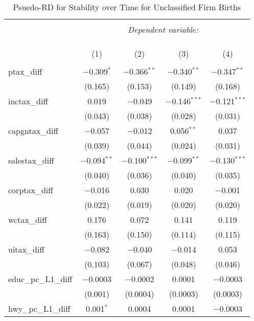 
\begin{table}[!htbp] \centering 
  \caption{Psuedo-RD for Stability over Time for  Unclassified Firm Births} 
  \label{} 
\begin{tabular}{@{\extracolsep{5pt}}lcccc} 
\\[-1.8ex]\hline 
\hline \\[-1.8ex] 
 & \multicolumn{4}{c}{\textit{Dependent variable:}} \\ 
\cline{2-5} 
\\[-1.8ex] & \multicolumn{4}{c}{ } \\ 
\\[-1.8ex] & (1) & (2) & (3) & (4)\\ 
\hline \\[-1.8ex] 
 ptax\_diff & $-$0.309$^{*}$ & $-$0.366$^{**}$ & $-$0.340$^{**}$ & $-$0.347$^{**}$ \\ 
  & (0.165) & (0.153) & (0.149) & (0.168) \\ 
  inctax\_diff & 0.019 & $-$0.049 & $-$0.146$^{***}$ & $-$0.121$^{***}$ \\ 
  & (0.043) & (0.038) & (0.028) & (0.031) \\ 
  capgntax\_diff & $-$0.057 & $-$0.012 & 0.056$^{**}$ & 0.037 \\ 
  & (0.039) & (0.044) & (0.024) & (0.031) \\ 
  salestax\_diff & $-$0.094$^{**}$ & $-$0.100$^{***}$ & $-$0.099$^{**}$ & $-$0.130$^{***}$ \\ 
  & (0.040) & (0.036) & (0.040) & (0.035) \\ 
  corptax\_diff & $-$0.016 & 0.030 & 0.020 & $-$0.001 \\ 
  & (0.022) & (0.019) & (0.020) & (0.020) \\ 
  wctax\_diff & 0.176 & 0.072 & 0.141 & 0.119 \\ 
  & (0.163) & (0.150) & (0.114) & (0.115) \\ 
  uitax\_diff & $-$0.082 & $-$0.040 & $-$0.014 & 0.053 \\ 
  & (0.103) & (0.067) & (0.048) & (0.046) \\ 
  educ\_pc\_L1\_diff & $-$0.0003 & $-$0.0002 & 0.0001 & $-$0.0003 \\ 
  & (0.001) & (0.0004) & (0.0003) & (0.0003) \\ 
  hwy\_pc\_L1\_diff & 0.001$^{*}$ & 0.0004 & 0.0001 & $-$0.0003 \\ 

\end{tabular}
\end{table}
